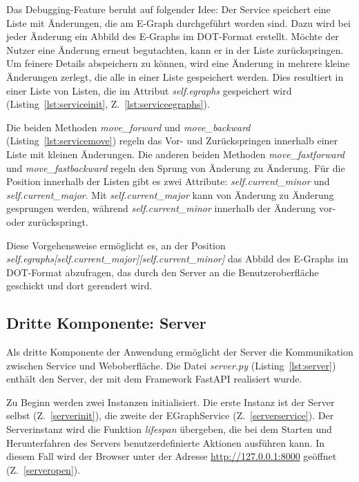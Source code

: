 Das Debugging-Feature beruht auf folgender Idee: Der Service speichert eine Liste mit Änderungen, die am E-Graph durchgeführt worden sind.
Dazu wird bei jeder Änderung ein Abbild des E-Graphs im DOT-Format erstellt.
Möchte der Nutzer eine Änderung erneut begutachten, kann er in der Liste zurückspringen. Um feinere Details abspeichern zu können, wird 
eine Änderung in mehrere kleine Änderungen zerlegt, die alle in einer Liste gespeichert werden. Dies resultiert in einer Liste von Listen,
die im Attribut \textit{self.egraphs} gespeichert wird (Listing~\ref{lst:serviceinit}, Z.~\ref{lst:serviceegraphs}).

Die beiden Methoden \textit{move\_forward} und \textit{move\_backward} (Listing~\ref{lst:servicemove}) regeln das Vor- und Zurückspringen innerhalb einer Liste mit kleinen Änderungen.
Die anderen beiden Methoden \textit{move\_fastforward} und \textit{move\_fastbackward} regeln den Sprung von Änderung zu Änderung.
Für die Position innerhalb der Listen gibt es zwei Attribute: \textit{self.current\_minor} und \textit{self.current\_major}. Mit \textit{self.current\_major} kann von Änderung
zu Änderung gesprungen werden, während \textit{self.current\_minor} innerhalb der Änderung vor- oder zurückspringt.

Diese Vorgehensweise ermöglicht es, an der Position \textit{self.egraphs[self.current\_major][self.current\_minor]} das Abbild des E-Graphs im DOT-Format abzufragen,
das durch den Server an die Benutzeroberfläche geschickt und dort gerendert wird.

\subsection{Dritte Komponente: Server}

Als dritte Komponente der Anwendung ermöglicht der Server die Kommunikation zwischen Service und Weboberfläche. 
Die Datei \textit{server.py} (Listing~\ref{lst:server}) enthält den Server, der mit dem Framework FastAPI realisiert wurde.

\noindent Zu Beginn werden zwei Instanzen initialisiert. Die erste Instanz ist der Server selbst (Z.~\ref{serverinit}), die zweite der EGraphService (Z.~\ref{serverservice}).
Der Serverinstanz wird die Funktion \textit{lifespan} übergeben, die bei dem Starten und Herunterfahren des Servers benutzerdefinierte Aktionen ausführen kann.
In diesem Fall wird der Browser unter der Adresse \url{http://127.0.0.1:8000} geöffnet (Z.~\ref{serveropen}).

